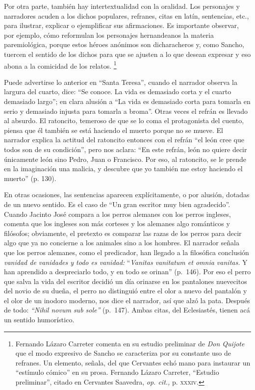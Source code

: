 \documentclass[14pt,twoside,final]{extbook} %
\let\oldfootnote\footnote
\renewcommand\footnote[1]{%
\oldfootnote{\hspace{1mm}#1}}
\begin{document}
Por otra parte, también hay intertextualidad con la oralidad. Los personajes y narradores acuden a los dichos populares, refranes, citas en latín, sentencias, etc., para ilustrar, explicar o ejemplificar sus afirmaciones. Es importante observar, por ejemplo, cómo reformulan los personajes hernandeanos la materia paremiológica, porque estos héroes anónimos son dicharacheros y, como Sancho, tuercen el sentido de los dichos para que se ajusten a lo que desean expresar y eso abona a la comicidad de los relatos.\footnote{Fernando Lázaro Carreter comenta en su estudio preliminar de \emph{Don Quijote} que el modo expresivo de Sancho se caracteriza por su constante uso de refranes. Un elemento, señala, del que Cervantes echó mano para instaurar un ``estímulo cómico'' en su prosa. Fernando Lázaro Carreter, ``Estudio preliminar'', citado en Cervantes Saavedra, \emph{op. cit.,} p. \textsc{xxxiv}.}

Puede advertirse lo anterior en ``Santa Teresa'', cuando el narrador observa la largura del cuarto, dice: ``Se conoce. La vida es demasiado corta y el cuarto demasiado largo''; en clara alusión a ``La vida es demasiado corta para tomarla en serio y demasiado injusta para tomarla a broma''. Otras veces el refrán es llevado al absurdo. El ratoncito, temeroso de que se lo coma el protagonista del cuento, piensa que él también se está haciendo el muerto porque no se mueve. El narrador explica la actitud del ratoncito entonces con el refrán ``el león cree que todos son de su condición'', pero nos aclara: ``En este refrán, león no quiere decir únicamente león sino Pedro, Juan o Francisco. Por eso, al ratoncito, se le prende en la imaginación una malicia, y descubre que yo también me estoy haciendo el muerto'' (p. 130).

En otras ocasiones, las sentencias aparecen explícitamente, o por alusión, dotadas de un nuevo sentido. Es el caso de ``Un gran escritor muy bien agradecido''. Cuando Jacinto José compara a los perros alemanes con los perros ingleses, comenta que los ingleses son más corteses y los alemanes algo románticos y filósofos; obviamente, el pretexto es comparar las razas de los perros para decir algo que ya no concierne a los animales sino a los hombres. El narrador señala que los perros alemanes, como el predicador, han llegado a la filosófica conclusión \emph{vanidad de vanidades y todo es vanidad:} ``\emph{Vanitas vanitatum et omnia vanitas.} Y han aprendido a despreciarlo
todo, y en todo se orinan'' (p.~146). Por eso el perro que salva la vida del escritor decidió un día orinarse en los pantalones nuevecitos del novio de su dueña, el perro no distinguió entre el olor a nuevo del pantalón y el olor de un inodoro moderno, nos dice el narrador, así que alzó la pata. Después de todo: \emph{``Nihil novum sub sole''} (p.~147). Ambas citas, del Eclesiastés, tienen acá un sentido humorístico.
\end{document}
